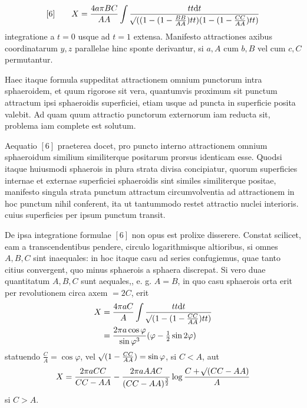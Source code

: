 \[
[6]\qquad X=\frac{4a\pi BC}{AA}\int\frac{tt\mathrm{d}t}{\mathord{{}^{}\!\surd}((1-(1-\frac{BB}{AA})tt)(1-(1-\frac{CC}{AA})tt)}
\]
integratione a $t=0$ usque ad $t=1$ extensa. Manifesto attractiones axibus coordinatarum $y,z$ parallelae hinc sponte derivantur, si $a,A$ cum $b,B$ vel cum $c,C$ permutantur.

Haec itaque formula suppeditat attractionem omnium punctorum intra sphaeroidem, et quum rigorose sit vera, quantumvis proximum sit punctum attractum ipsi sphaeroidis superficiei, etiam usque ad puncta in superficie posita valebit. Ad quam quum attractio punctorum externorum iam reducta sit, problema iam complete est solutum.

Aequatio $[6]$ praeterea docet, pro puncto interno attractionem omnium sphaeroidum similium similiterque positarum prorsus identicam esse. Quodsi itaque huiusmodi sphaerois in plura strata divisa concipiatur, quorum superficies internae et externae superficiei sphaeroidis sint similes similiterque positae, manifesto singula strata punctum attractum circumvolventia ad attractionem in hoc punctum nihil conferent, ita ut tantummodo restet attractio nuclei interioris. cuius superficies per ipsum punctum transit.

\par
De ipsa integratione formulae $[6]$ non opus est prolixe disserere. Constat scilicet, eam a transcendentibus pendere, circulo logarithmisque altioribus, si omnes $A,B,C$ sint inaequales: in hoc itaque casu ad series confugiemus, quae tanto citius convergent, quo minus sphaerois a sphaera discrepat. Si vero duae quantitatum $A,B,C$ sunt aequales,, e. g. $A=B$, in quo casu sphaerois orta erit per revolutionem circa axem $=2C$, erit
\[
\begin{aligned}
X&=\frac{4\pi aC}{A}\int\frac{tt\mathrm{d}t}{\mathord{{}^{}\!\surd}(1-(1-\frac{CC}{AA})tt)}\\
&=\frac{2\pi a\cos\varphi}{\sin\varphi^3}(\varphi-\tfrac12\sin2\varphi)
\end{aligned}
\]
statuendo $\frac{C}{A}=\cos\varphi$, vel $\mathord{{}^{}\!\surd}(1-\frac{CC}{AA})=\sin\varphi$, si $C<A$, aut
\[
X=\frac{2\pi aCC}{CC-AA}-\frac{2\pi aAAC}{(CC-AA)^{\frac32}}\log\frac{C+\mathord{{}^{}\!\surd}(CC-AA)}{A}
\]
si $C>A$.
